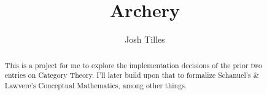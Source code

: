 \documentclass[11pt,a4paper]{article}
\begin{document}
\title{Archery}
\author{Josh Tilles}
\maketitle

\begin{abstract}
  This is a project for me to explore the implementation decisions of the prior two entries on Category Theory.
  I'll later build upon that to formalize Schanuel's & Lawvere's Conceptual Mathematics, among other things.
\end{abstract}

\tableofcontents





\end{document}
